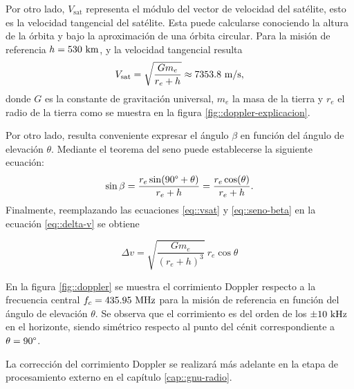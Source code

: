 \documentclass[../../main.tex]{subfiles}
\begin{document}
Por otro lado, $V_\textrm{sat}$ representa el módulo del vector de velocidad del satélite, esto es la velocidad tangencial del satélite. Esta puede calcularse conociendo la altura de la órbita y bajo la aproximación de una órbita circular. Para la misión de referencia $h = 530~\textrm{km}$, y la velocidad tangencial resulta 
\begin{equation}
    V_\textrm{sat} = \sqrt{\frac{G m_e}{r_e + h}} \approx 7353.8~\textrm{m/s},
    \label{eq::vsat}
\end{equation}
donde $G$ es la constante de gravitación universal, $m_e$ la masa de la tierra y $r_e$ el radio de la tierra como se muestra en la figura \ref{fig::doppler-explicacion}.

Por otro lado, resulta conveniente expresar el ángulo $\beta$ en función del ángulo de elevación $\theta$. Mediante el teorema del seno puede establecerse la siguiente ecuación:
\begin{equation}
    \sin \beta = \frac{r_e \sin(90\degree + \theta)}{r_e + h} =  \frac{r_e \cos(\theta)}{r_e + h}.
    \label{eq::seno-beta}
\end{equation}
Finalmente, reemplazando las ecuaciones \ref{eq::vsat} y \ref{eq::seno-beta} en la ecuación \ref{eq::delta-v} se obtiene

\begin{equation}
    \Delta v = \sqrt{\frac{G m_e}{(r_e + h)^{3}}} \ r_e \cos \theta
\end{equation}

En la figura \ref{fig::doppler} se muestra el corrimiento Doppler respecto a la frecuencia central $f_c = 435.95~\textrm{MHz}$ para la misión de referencia en función del ángulo de elevación $\theta$. Se observa que el corrimiento es del orden de los $\pm10~\textrm{kHz}$ en el horizonte, siendo simétrico respecto al punto del cénit correspondiente a $\theta = 90\degree$.

La corrección del corrimiento Doppler se realizará más adelante en la etapa de procesamiento externo en el capítulo \ref{cap::gnu-radio}.


\end{document}

